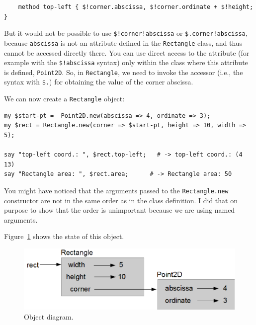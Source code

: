 \begin{verbatim}
    method top-left { $!corner.abscissa, $!corner.ordinate + $!height; }
\end{verbatim}

But it would not be possible to use \verb'$!corner!abscissa' or 
\verb'$.corner!abscissa', because {\tt abscissa} is not an 
attribute defined in the {\tt Rectangle} class, and thus cannot 
be accessed directly there. You can use direct access 
to the attribute (for example with the \verb'$!abscissa' syntax) 
only within the class where this attribute is defined, 
{\tt Point2D}. So, in {\tt Rectangle}, we need to invoke the 
accessor (i.e., the syntax with \verb'$.') for obtaining the 
value of the corner abscissa.

We can now create a {\tt Rectangle} object:

\begin{verbatim}
my $start-pt =  Point2D.new(abscissa => 4, ordinate => 3);
my $rect = Rectangle.new(corner => $start-pt, height => 10, width => 5);

say "top-left coord.: ", $rect.top-left;   # -> top-left coord.: (4 13)
say "Rectangle area: ", $rect.area;      # -> Rectangle area: 50
\end{verbatim}

You might have noticed that the arguments passed to the 
{\tt Rectangle.new} constructor are not in the same order as 
in the class definition. I did that on purpose 
to show that the order is unimportant because we 
are using named arguments.

Figure~\ref{fig.rectangle} shows the state of this object.

\begin{figure}
\centerline
{\includegraphics[scale=0.8]{figs/rectangle.png}}
\caption{Object diagram.}
\label{fig.rectangle}
\end{figure}


